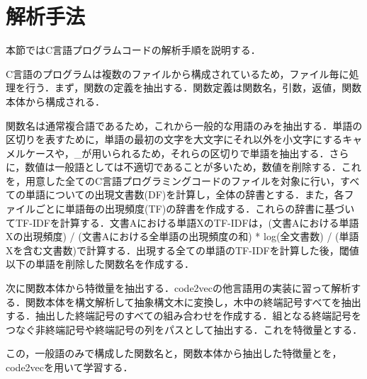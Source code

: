 \documentclass[submit,techrep,noauthor]{ipsj}
\begin{document}
\section{解析手法}

本節ではC言語プログラムコードの解析手順を説明する．

C言語のプログラムは複数のファイルから構成されているため，ファイル毎に処理を行う．まず，関数の定義を抽出する．関数定義は関数名，引数，返値，関数本体から構成される．

関数名は通常複合語であるため，これから一般的な用語のみを抽出する．単語の区切りを表すために，単語の最初の文字を大文字にそれ以外を小文字にするキャメルケースや，\_が用いられるため，それらの区切りで単語を抽出する．さらに，数値は一般語としては不適切であることが多いため，数値を削除する．これを，用意した全てのC言語プログラミングコードのファイルを対象に行い，すべての単語についての出現文書数(DF)を計算し，全体の辞書とする．また，各ファイルごとに単語毎の出現頻度(TF)の辞書を作成する．これらの辞書に基づいてTF-IDFを計算する．文書Aにおける単語XのTF-IDFは，{(文書Aにおける単語Xの出現頻度) / (文書Aにおける全単語の出現頻度の和)} * log{(全文書数) / (単語Xを含む文書数)}で計算する．出現する全ての単語のTF-IDFを計算した後，閾値以下の単語を削除した関数名を作成する．

次に関数本体から特徴量を抽出する．code2vecの他言語用の実装に習って解析する．関数本体を構文解析して抽象構文木に変換し，木中の終端記号すべてを抽出する．抽出した終端記号のすべての組み合わせを作成する．組となる終端記号をつなぐ非終端記号や終端記号の列をパスとして抽出する．これを特徴量とする．

この，一般語のみで構成した関数名と，関数本体から抽出した特徴量とを，code2vecを用いて学習する．





\end{document}

